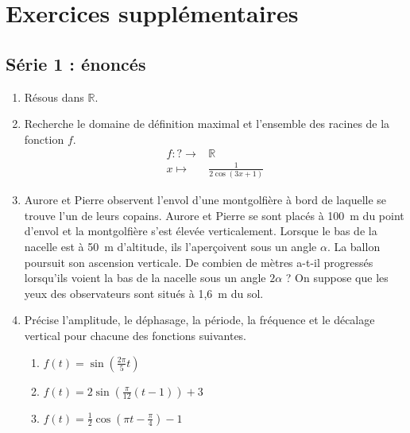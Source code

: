 \documentclass[a4paper,fontsize=13pt]{scrreprt}
\theoremstyle{plain}
\theoremstyle{definition}
\newcommand{\rr}{\mathbb{R}}
\newenvironment{benumerate}[1][0pt]{\begin{enumerate}\renewcommand{\makelabel}[1]{\textbf{##1}}\setlength{\itemsep}{#1}}{\end{enumerate}}
\renewcommand{\d}{\displaystyle}
\begin{document}
\chapter{Exercices supplémentaires}

\section{Série 1 : énoncés}

\begin{benumerate}[14pt]

\item Résous dans $\rr$.
\begin{benumerate}[3pt]
\end{benumerate}

\item Recherche le domaine de définition maximal et l'ensemble des racines de la fonction $f$.
\begin{align*}
f : ? \to& \rr \\
x \mapsto& \frac{1}{2\cos (3x+1)}
\end{align*}

\item Aurore et Pierre observent l'envol d'une montgolfière à bord de laquelle se trouve l'un de leurs copains. Aurore et Pierre se sont placés à 100~m du point d'envol et la montgolfière s'est élevée verticalement. Lorsque le bas de la nacelle est à 50~m d'altitude, ils l'aperçoivent sous un angle $\alpha$. La ballon poursuit son ascension verticale. De combien de mètres a-t-il progressés lorsqu'ils voient la bas de la nacelle sous un angle $2\alpha$ ? On suppose que les yeux des observateurs sont situés à 1,6~m du sol.

\item Précise l'amplitude, le déphasage, la période, la fréquence et le décalage vertical pour chacune des fonctions suivantes.
\begin{benumerate}[3pt]
\item $\d f(t)=\sin\left(\frac{2\pi}{5}t\right)$
\item $\d f(t) = 2\sin\left(\frac{\pi}{12}(t-1)\right)+3$
\item $\d f(t) = \frac{1}{2}\cos\left(\pi t - \frac{\pi}{4}\right)-1$
\end{benumerate}


\end{benumerate}
\end{document}
